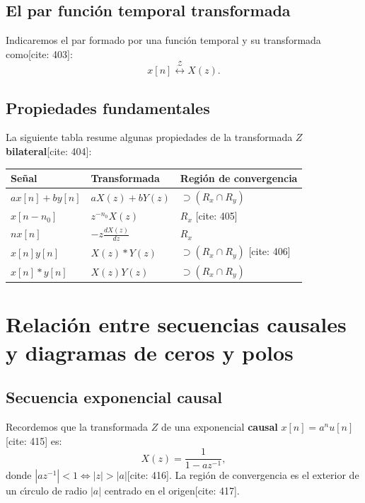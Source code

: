 \subsection{El par funci\'{o}n temporal transformada}
Indicaremos el par formado por una funci\'{o}n temporal y su transformada como[cite: 403]:
\begin{equation}
	x[n] \stackrel{\mathcal{Z}}{\longleftrightarrow} X(z).
\end{equation}

\subsection{Propiedades fundamentales}

La siguiente tabla resume algunas propiedades de la transformada $Z$ \textbf{bilateral}[cite: 404]:
\begin{center}
	\begin{tabular}{lll}
		\textbf{Se\~{n}al} & \textbf{Transformada} & \textbf{Regi\'{o}n de convergencia} \\ 
		\hline
		$a x[n] + b y[n]$ & $a X(z) + b Y(z)$ & $\supset (R_{x} \cap R_{y})$ \\ 
		$x[n-n_{0}]$ & $z^{-n_{0}} X(z)$ & $R_{x}$ [cite: 405] \\ 
		$n x[n]$ & $-z \frac{dX(z)}{dz}$ & $R_{x}$ \\ 
		$x[n] y[n]$ & $X(z) * Y(z)$ & $\supset (R_{x} \cap R_{y})$ [cite: 406] \\ 
		$x[n] * y[n]$ & $X(z) Y(z)$ & $\supset (R_{x} \cap R_{y})$
	\end{tabular}
\end{center}

\section{Relaci\'{o}n entre secuencias causales y diagramas de ceros y polos}

\subsection{Secuencia exponencial causal}
Recordemos que la transformada $Z$ de una exponencial \textbf{causal} $x[n] = a^{n} u[n]$ [cite: 415] es:
\begin{equation}
	X(z) = \frac{1}{1-a z^{-1}},
\end{equation}
donde $|a z^{-1}| < 1 \Leftrightarrow |z| > |a|$[cite: 416]. La regi\'{o}n de convergencia es el exterior de un c\'{\i}rculo de radio $|a|$ centrado en el origen[cite: 417].


